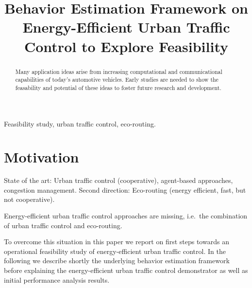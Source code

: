 \documentclass[conference]{../cls/IEEEtran}
\begin{document}
\title{Behavior Estimation Framework on Energy-Efficient Urban Traffic Control to Explore Feasibility}

\author{
	\and
}

\maketitle

\begin{abstract}
Many application ideas arise from increasing computational and communicational capabilities of today's automotive vehicles.
Early studies are needed to show the feasability and potential of these ideas to foster future research and development.
\end{abstract}

\begin{IEEEkeywords}
Feasibility study, urban traffic control, eco-routing.
\end{IEEEkeywords}

\section{Motivation}

State of the art: Urban traffic control (cooperative), agent-based approaches, congestion management. 
Second direction: Eco-routing (energy efficient, fast, but not cooperative).

Energy-efficient urban traffic control approaches are missing, i.e.\ the combination of urban traffic control and eco-routing.

To overcome this situation in this paper we report on first steps towards an operational feasibility study of energy-efficient urban traffic control.
In the following we describe shortly the underlying behavior estimation framework before explaining the energy-efficient urban traffic control demonstrator as well as initial performance analysis results.
\end{document}
